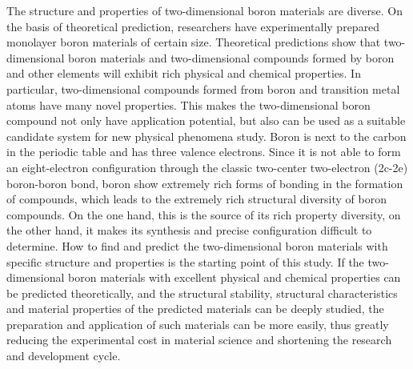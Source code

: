 \documentclass[phd,nobackinfo]{scutthesis}
\begin{document}
\begin{englishabstract}
The structure and properties of two-dimensional boron materials are diverse. On the basis of theoretical prediction, researchers have experimentally prepared monolayer boron materials of certain size.
Theoretical predictions show that two-dimensional boron materials and two-dimensional compounds formed by boron and other elements will exhibit rich physical and chemical properties.
In particular, two-dimensional compounds formed from boron and transition metal atoms have many novel properties. This makes the two-dimensional boron compound not only have application potential, but also can be used as a suitable candidate system for new physical phenomena study.
Boron is next to the carbon in the periodic table and has three valence electrons. Since it is not able to form an eight-electron configuration through the classic two-center two-electron (2c-2e) boron-boron bond, boron show extremely rich forms of bonding in the formation of compounds, which leads to the extremely rich structural diversity of boron compounds.
On the one hand, this is the source of its rich property diversity, on the other hand, it makes its synthesis and precise configuration difficult to determine.
How to find and predict the two-dimensional boron materials with specific structure and properties is the starting point of this study.
If the two-dimensional boron materials with excellent physical and chemical properties can be predicted theoretically, and the structural stability, structural characteristics and material properties of the predicted materials can be deeply studied, the preparation and application of such materials can be more easily, thus greatly reducing the experimental cost in material science and shortening the research and development cycle.


\end{englishabstract}
\end{document}
